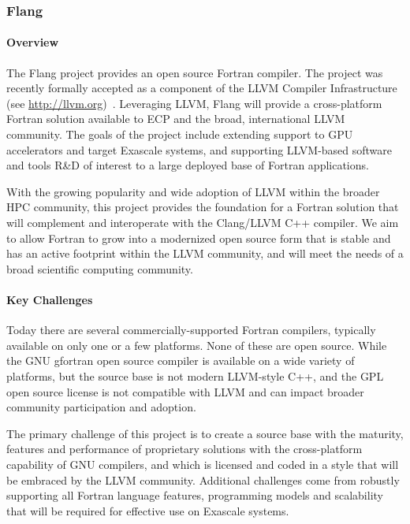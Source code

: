 \subsubsection{ Flang}\label{subsubsect:flang}

\paragraph{Overview}

The Flang project provides an open source Fortran
\cite{iso-fortran-2004} \cite{iso-fortran-2010} \cite{iso-fortran-2018}
compiler.  The project was recently formally accepted as a component
of the LLVM Compiler Infrastructure (see \url{http://llvm.org})~\cite{llvm:homepage}.
Leveraging LLVM, Flang will provide a cross-platform Fortran solution available to
ECP and the broad, international LLVM community. The goals of the project include
extending support to GPU accelerators and target Exascale systems, and supporting
LLVM-based software and tools R\&D of interest to a large deployed
base of Fortran applications.

With the growing popularity and wide adoption of LLVM within the
broader HPC community, this project provides the foundation for a
Fortran solution that will complement and interoperate with the
Clang/LLVM C++ compiler.  We aim to allow Fortran to grow into a
modernized open source form that is stable and has an active footprint
within the LLVM community, and will meet the needs of a broad
scientific computing community.

\paragraph{Key Challenges}
Today there are several commercially-supported Fortran compilers,
typically available on only one or a few platforms.  None of these are
open source.  While the GNU gfortran open source compiler is available
on a wide variety of platforms, but the source base is not modern
LLVM-style C++, and the GPL open source license is not compatible with
LLVM and can impact broader community participation and adoption.

The primary challenge of this project is to create a source base with
the maturity, features and performance of proprietary solutions with
the cross-platform capability of GNU compilers, and which is licensed
and coded in a style that will be embraced by the LLVM community.
Additional challenges come from robustly supporting all Fortran
language features, programming models and scalability that will be
required for effective use on Exascale systems. 

